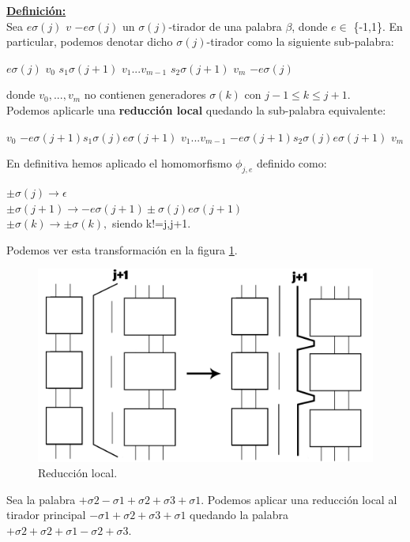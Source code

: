 \documentclass[14pt]{extarticle}
\begin{document}
\underline{\textbf{ Definición:}}\\
Sea $ e \sigma(j)$ $v$ $-e \sigma(j) $ un $\sigma(j)$-tirador de una palabra $\beta$, donde $e \in$ \{-1,1\}. En particular, podemos denotar dicho $\sigma(j)$-tirador como la siguiente sub-palabra:
\begin{center}
	$ e \sigma(j) $ $ v_{0} $ $s_{1} \sigma(j+1) $ $ v_{1}...v_{m-1} $ $s_{2} \sigma(j+1) $ $ v_{m} $ $ -e \sigma(j) $
\end{center} donde $v_{0},...,v_{m}$ no contienen generadores $\sigma(k)$ con $ j-1 \le k \le j+1 $.\\
Podemos aplicarle una \textbf{reducción local} quedando la sub-palabra equivalente:
\begin{center}
 $ v_{0} $ $-e \sigma(j+1) s_{1} \sigma(j) e \sigma(j+1)$ $ v_{1}...v_{m-1} $ $-e \sigma(j+1) s_{2} \sigma(j) e \sigma(j+1)$ $ v_{m} $
\end{center}
En definitiva hemos aplicado el homomorfismo $\phi_{j,e}$ definido como:\\
\begin{center}
	$\pm \sigma(j) \rightarrow \epsilon$\\
	$\pm \sigma(j+1) \rightarrow -e \sigma(j+1) \pm \sigma(j) e \sigma(j+1)$\\
	$\pm \sigma(k) \rightarrow \pm \sigma(k),$ siendo k!=j,j+1.\\
\end{center}

Podemos ver esta transformación en la figura \ref{h3}.\\
\begin{figure}[h!]
	\centering
	\includegraphics[width=12cm]{itrenzas/h14.png}
	\caption{Reducción local.}
	\label{h3} 
\end{figure}

Sea la palabra $+\sigma2-\sigma1+\sigma2+\sigma3+\sigma1$. Podemos aplicar una reducción local al tirador principal $-\sigma1+\sigma2+\sigma3+\sigma1$ quedando la palabra $+\sigma2+\sigma2+\sigma1-\sigma2+\sigma3$.\\
\end{document}
